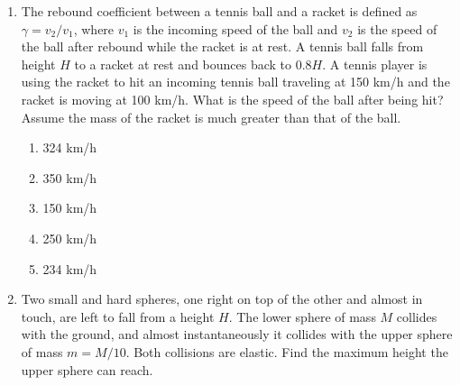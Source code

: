 \documentclass[12pt,letterpaper]{article}
\begin{document}
\begin{enumerate}[resume]
\item
The rebound coefficient between a tennis ball and a racket is defined as $\gamma = v_2/v_1$, where $v_1$ is the incoming speed of the ball and $v_2$ is the speed of the ball after rebound while the racket is at rest. A tennis ball falls from height $H$ to a racket at rest and bounces back to $0.8H$. A tennis player is using the racket to hit an incoming tennis ball traveling at 150 km/h and the racket is moving at 100 km/h. What is the speed of the ball after being hit? Assume the mass of the racket is much greater than that of the ball.
\begin{enumerate}
\item 324 km/h
\item 350 km/h
\item 150 km/h
\item 250 km/h
\item 234 km/h
\end{enumerate}

\item
Two small and hard spheres, one right on top of the other and almost in touch, are left to fall from a height $H$. The lower sphere of mass $M$ collides with the ground, and almost instantaneously it collides with the upper sphere of mass $m = M/10$. Both collisions are elastic. Find the maximum height the upper sphere can reach.

\begin{tabular}{l r}


\end{tabular}
\end{enumerate}
\end{document}
